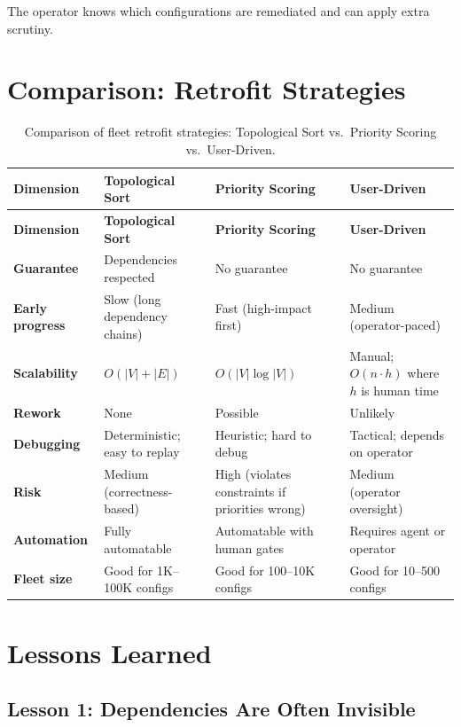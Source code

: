 The operator knows which configurations are remediated and can apply extra scrutiny.

\section{Comparison: Retrofit Strategies}

\begin{longtable}{@{}p{2.5cm}p{2.8cm}p{2.8cm}p{2.8cm}@{}}
\caption{Comparison of fleet retrofit strategies: Topological Sort vs.\ Priority Scoring vs.\ User-Driven.}
\label{tab:retrofit-comparison} \\
\toprule
\textbf{Dimension} & \textbf{Topological Sort} & \textbf{Priority Scoring} & \textbf{User-Driven} \\
\midrule
\endfirsthead
\toprule \textbf{Dimension} & \textbf{Topological Sort} & \textbf{Priority Scoring} & \textbf{User-Driven} \\
\midrule
\endhead
\textbf{Guarantee} & Dependencies respected & No guarantee & No guarantee \\
\textbf{Early progress} & Slow (long dependency chains) & Fast (high-impact first) & Medium (operator-paced) \\
\textbf{Scalability} & $O(|V| + |E|)$ & $O(|V| \log |V|)$ & Manual; $O(n \cdot h)$ where $h$ is human time \\
\textbf{Rework} & None & Possible & Unlikely \\
\textbf{Debugging} & Deterministic; easy to replay & Heuristic; hard to debug & Tactical; depends on operator \\
\textbf{Risk} & Medium (correctness-based) & High (violates constraints if priorities wrong) & Medium (operator oversight) \\
\textbf{Automation} & Fully automatable & Automatable with human gates & Requires agent or operator \\
\textbf{Fleet size} & Good for 1K–100K configs & Good for 100–10K configs & Good for 10–500 configs \\
\bottomrule
\end{longtable}

\section{Lessons Learned}

\subsection{Lesson 1: Dependencies Are Often Invisible}

